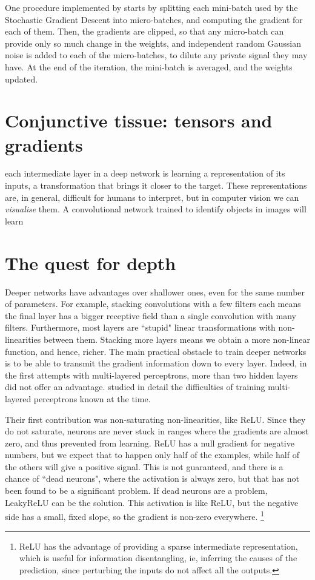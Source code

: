 One procedure implemented by \citet{tf_privacy} starts by splitting each mini-batch used by the Stochastic Gradient Descent into micro-batches, and computing the gradient for each of them.
Then, the gradients are clipped, so that any micro-batch can provide only so much change in the weights, and independent random Gaussian noise is added to each of the micro-batches, to dilute any private signal they may have.
At the end of the iteration, the mini-batch is averaged, and the weights updated.


\section[Tensors and gradients]{Conjunctive tissue: tensors and gradients}\label{sec:tensors}
each intermediate layer in a deep network is learning a representation of its inputs, a transformation that brings it closer to the target.
These representations are, in general, difficult for humans to interpret, but in computer vision we can \emph{visualise} them.
A convolutional network trained to identify objects in images will learn


\section{The quest for depth}\label{sec:depth}
Deeper networks have advantages over shallower ones, even for the same number of parameters.
For example, stacking convolutions with a few filters each means the final layer has a bigger receptive field than a single convolution with many filters.
Furthermore, most layers are ``stupid" linear transformations with non-linearities between them.
Stacking more layers means we obtain a more non-linear function, and hence, richer.
The main practical obstacle to train deeper networks is to be able to transmit the gradient information down to every layer.
Indeed, in the first attempts with multi-layered perceptrons, more than two hidden layers did not offer an advantage.
\citet{glorot} studied in detail the difficulties of training multi-layered perceptrons known at the time.

Their first contribution  was non-saturating non-linearities, like ReLU.
Since they do not saturate, neurons are never stuck in ranges where the gradients are almost zero, and thus prevented from learning.
ReLU has a null gradient for negative numbers, but we expect that to happen only half of the examples, while half of the others will give a positive signal.
This is not guaranteed, and there is a chance of ``dead neurons", where the activation is always zero, but that has not been found to be a significant problem.
If dead neurons are a problem, LeakyReLU   can be the solution.
This activation is like ReLU, but the negative side has a small, fixed slope, so the gradient is non-zero everywhere.
\footnote{ReLU has the advantage of providing a sparse intermediate representation, which is useful for information disentangling, ie, inferring the causes of the prediction, since perturbing the inputs do not affect all the outputs.}

